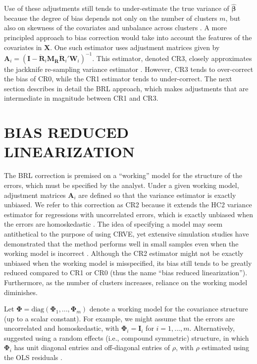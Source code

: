 \documentclass[12pt]{article}\usepackage[]{graphicx}\usepackage[]{color}
\newcommand{\bm}{\mathbf}
\newcommand{\bs}{\boldsymbol}
\begin{document}
Use of these adjustments still tends to under-estimate the true variance of $\hat{\bs\beta}$ because the degree of bias depends not only on the number of clusters $m$, but also on skewness of the covariates and unbalance across clusters \citep{Carter2013asymptotic, MacKinnon2013thirty, Cameron2015practitioners}. 
A more principled approach to bias correction would take into account the features of the covariates in $\bm{X}$. 
One such estimator uses adjustment matrices given by $\bm{A}_i = \left(\bm{I} - \bm{\ddot{R}}_i \bm{M_{\ddot{R}}}\bm{\ddot{R}}_i'\bm{W}_i\right)^{-1}$. This estimator, denoted CR3, closely approximates the jackknife re-sampling variance estimator \citep{Bell2002bias, Mancl2001covariance}.  
However, CR3 tends to over-correct the bias of CR0, while the CR1 estimator tends to under-correct. 
The next section describes in detail the BRL approach, which makes adjustments that are intermediate in magnitude between CR1 and CR3. 


\section{BIAS REDUCED LINEARIZATION}
\label{sec:BRL}

The BRL correction is premised on a ``working'' model for the structure of the errors, which must be specified by the analyst. 
Under a given working model, adjustment matrices $\bm{A}_i$ are defined so that the variance estimator is exactly unbiased.
We refer to this correction as CR2 because it extends the HC2 variance estimator for regressions with uncorrelated errors, which is exactly unbiased when the errors are homoskedastic \citep{MacKinnon1985some}.
The idea of specifying a model may seem antithetical to the purpose of using CRVE, yet extensive simulation studies have demonstrated that the method performs well in small samples even when the working model is incorrect \citep[][]{Bell2002bias, Cameron2015practitioners, Imbens2015robust}. 
Although the CR2 estimator might not be exactly unbiased when the working model is misspecified, its bias still tends to be greatly reduced compared to CR1 or CR0 (thus the name ``bias reduced linearization''). Furthermore, as the number of clusters increases, reliance on the working model diminishes. 

Let $\bs\Phi = \text{diag}\left(\bs\Phi_1,...,\bs\Phi_m\right)$ denote a working model for the covariance structure (up to a scalar constant). 
For example, we might assume that the errors are uncorrelated and homoskedastic, with $\bs\Phi_i = \bm{I}_i$ for $i = 1,...,m$. 
Alternatively, \citet{Imbens2015robust} suggested using a random effects (i.e., compound symmetric) structure, in which $\bs\Phi_i$ has unit diagonal entries and off-diagonal entries of $\rho$, with $\rho$ estimated using the OLS residuals \citep[see][p. 16]{Imbens2015robust}.
\end{document}

